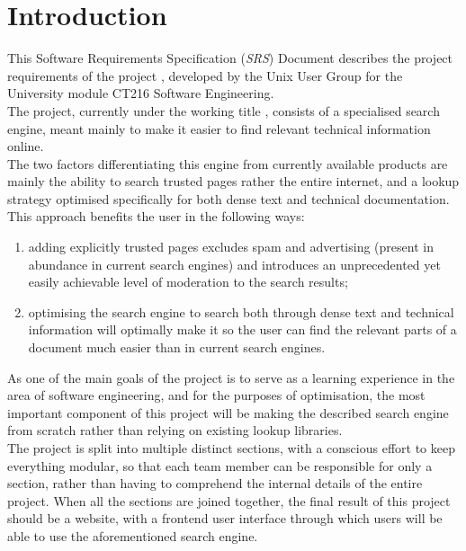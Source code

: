 \section{Introduction}

This Software Requirements Specification (\textit{SRS}) Document describes the project requirements of the project \projectname, 
developed by the Unix User Group for the University module CT216 Software Engineering. \\

The project, currently under the working title \projectname, consists of a specialised search engine, meant mainly to make it easier to find relevant technical information online. \\

The two factors differentiating this engine from currently available products are mainly the ability to search trusted pages rather the entire internet, 
and a lookup strategy optimised specifically for both dense text and technical documentation.
This approach benefits the user in the following ways:
\begin{enumerate}
    \item adding explicitly trusted pages excludes spam and advertising (present in abundance in current search engines) and introduces an unprecedented yet easily achievable level of moderation to the search results;
    \item optimising the search engine to search both through dense text and technical information will optimally make it so the user can find the relevant parts of a document much easier than in current search engines.
\end{enumerate}

As one of the main goals of the project is to serve as a learning experience in the area of software engineering, and for the purposes of optimisation, 
the most important component of this project will be making the described search engine from scratch rather than relying on existing lookup libraries. \\

The project is split into multiple distinct sections, with a conscious effort to keep everything modular, so that each team member can be responsible for only a section,
rather than having to comprehend the internal details of the entire project.
When all the sections are joined together, the final result of this project should be a website, with a frontend user interface through which users will be able to use the aforementioned search engine. \\

